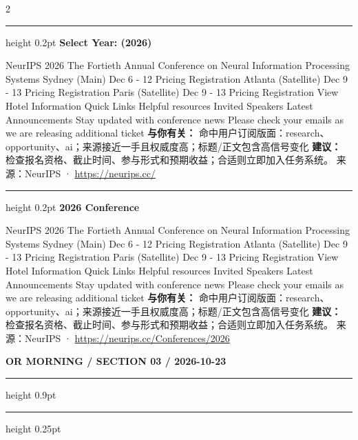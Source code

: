 \documentclass[10.5pt]{ctexart}
\begin{document}
\begin{multicols}{2}
\vspace{2mm}
\hrule height 0.2pt
\vspace{2mm}
{\large\bfseries Select Year: (2026)}\par
NeurIPS 2026 The Fortieth Annual Conference on Neural Information Processing Systems Sydney (Main) Dec 6 - 12 Pricing Registration Atlanta (Satellite) Dec 9 - 13 Pricing Registration Paris (Satellite) Dec 9 - 13 Pricing Registration View Hotel Information Quick Links Helpful resources Invited Speakers Latest Announcements Stay updated with conference news Please check your emails as we are releasing additional ticket
\textbf{与你有关：} 命中用户订阅版面：research、opportunity、ai；来源接近一手且权威度高；标题/正文包含高信号变化
\textbf{建议：} 检查报名资格、截止时间、参与形式和预期收益；合适则立即加入任务系统。
{\footnotesize\color{ormuted} 来源：NeurIPS · \url{https://neurips.cc/}}
\vspace{2mm}
\hrule height 0.2pt
\vspace{2mm}
{\large\bfseries 2026 Conference}\par
NeurIPS 2026 The Fortieth Annual Conference on Neural Information Processing Systems Sydney (Main) Dec 6 - 12 Pricing Registration Atlanta (Satellite) Dec 9 - 13 Pricing Registration Paris (Satellite) Dec 9 - 13 Pricing Registration View Hotel Information Quick Links Helpful resources Invited Speakers Latest Announcements Stay updated with conference news Please check your emails as we are releasing additional ticket
\textbf{与你有关：} 命中用户订阅版面：research、opportunity、ai；来源接近一手且权威度高；标题/正文包含高信号变化
\textbf{建议：} 检查报名资格、截止时间、参与形式和预期收益；合适则立即加入任务系统。
{\footnotesize\color{ormuted} 来源：NeurIPS · \url{https://neurips.cc/Conferences/2026}}
\end{multicols}
\newpage
{\small\bfseries OR MORNING / SECTION 03 / 2026-10-23}
\vspace{2mm}
\hrule height 0.9pt
\vspace{1.5mm}
\hrule height 0.25pt
\vspace{4mm}
\end{document}

